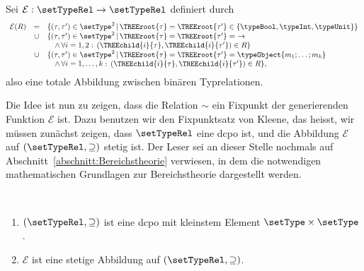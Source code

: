\begin{definition} \label{definition:Lort:Abbildung_E}
  Sei $\mathcal{E}: \setTypeRel \to \setTypeRel$ definiert durch
  \[\begin{array}{rcl}
    \mathcal{E}(R)
    &   =  & \{(\tau,\tau')\in\setType^2\,|\,\TREEroot{\tau} = \TREEroot{\tau'} \in \{\typeBool,\typeInt,\typeUnit\}\} \\
    & \cup & \{(\tau,\tau')\in\setType^2\,|\,\TREEroot{\tau} = \TREEroot{\tau'} =\ \to \\
    &      & \quad \wedge\,\forall i=1,2:\,(\TREEchild{i}{\tau},\TREEchild{i}{\tau'})\in{R}\} \\
    & \cup & \{(\tau,\tau')\in\setType^2\,|\,\TREEroot{\tau} = \TREEroot{\tau'} = \typeObject{m_1;\ldots;m_k} \\
    &      & \quad \wedge\,\forall i=1,\ldots,k:\,(\TREEchild{i}{\tau},\TREEchild{i}{\tau'})\in{R}\},
  \end{array}\]
  also eine totale Abbildung zwischen bin\"aren Typrelationen.
\end{definition}

Die Idee ist nun zu zeigen, dass die Relation $\sim$ ein Fixpunkt der generierenden Funktion $\mathcal{E}$ ist.
Dazu benutzen wir den Fixpunktsatz von Kleene, das heisst, wir m\"ussen zun\"achst zeigen, dass $\setTypeRel$
eine dcpo ist, und die Abbildung $\mathcal{E}$ auf $(\setTypeRel,\supseteq)$ stetig ist. Der Leser
sei an dieser Stelle nochmals auf Abschnitt~\ref{abschnitt:Bereichstheorie} verwiesen, in dem die notwendigen
mathematischen Grundlagen zur Bereichstheorie dargestellt werden.

\begin{lemma} \label{lemma:Lort:dcpo_und_Stetigkeit} \
  \begin{enumerate}
    \item $(\setTypeRel,\supseteq)$ ist eine dcpo mit kleinstem Element $\setType \times \setType$.
    \item $\mathcal{E}$ ist eine stetige Abbildung auf $(\setTypeRel,\supseteq)$.
  \end{enumerate}
\end{lemma}

